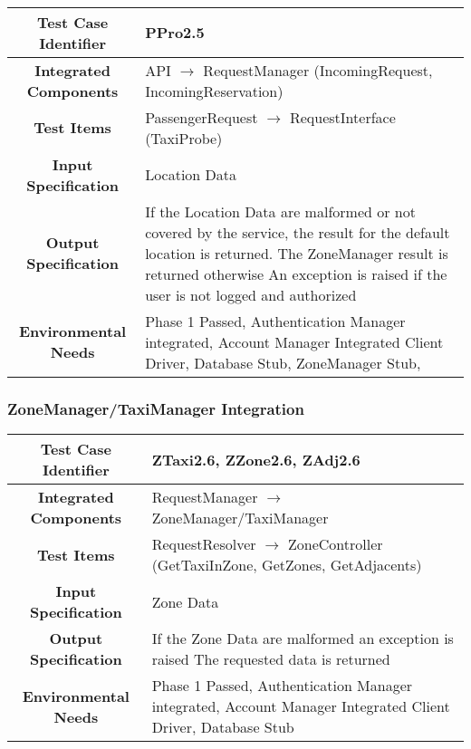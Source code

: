 \documentclass[11pt, a4paper,titlepage]{article}
\begin{document}
	 \subsubsection{}
	 \begin{tabularx}{\textwidth}{| c|X|}
	 	\hline \textbf{Test Case Identifier} & \label{PPro2.5}PPro2.5 \\
	 	\hline \textbf{Integrated Components} & API  $\rightarrow $ RequestManager (IncomingRequest, IncomingReservation) \\
	 	\hline \textbf{Test Items} & PassengerRequest $\rightarrow $ RequestInterface (TaxiProbe) \\
	 	\hline \textbf{Input Specification} & Location Data \\
	 	\hline \textbf{Output Specification} & If the Location Data are malformed or not covered by the service, the result for the default location is returned. The ZoneManager result is returned otherwise \newline
	 	An exception is raised if the user is not logged and authorized \\
	 	\hline \textbf{Environmental Needs} &  Phase 1 Passed, Authentication Manager integrated, Account Manager Integrated \newline 
	 	Client Driver, Database Stub, ZoneManager Stub,\\
	 	\hline
	 \end{tabularx}
	 \newline
	 
	 \subsubsection{ZoneManager/TaxiManager Integration}
	 \begin{tabularx}{\textwidth}{| c|X|}
	 	\hline \textbf{Test Case Identifier} & \label{ZTaxi2.6}ZTaxi2.6, \label{ZZone2.6}ZZone2.6, \label{ZAdj2.6}ZAdj2.6 \\
	 	\hline \textbf{Integrated Components} & RequestManager  $\rightarrow $  ZoneManager/TaxiManager \\
	 	\hline \textbf{Test Items} & RequestResolver $\rightarrow $ ZoneController (GetTaxiInZone, GetZones, GetAdjacents) \\
	 	\hline \textbf{Input Specification} & Zone Data \\
	 	\hline \textbf{Output Specification} & If the Zone Data are malformed an exception is raised \newline
											The requested data is returned \\
	 	\hline \textbf{Environmental Needs} &  Phase 1 Passed, Authentication Manager integrated, Account Manager Integrated \newline 
	 	Client Driver, Database Stub\\
	 	\hline
	 	\end{tabularx}
	 	\newline
\end{document}

